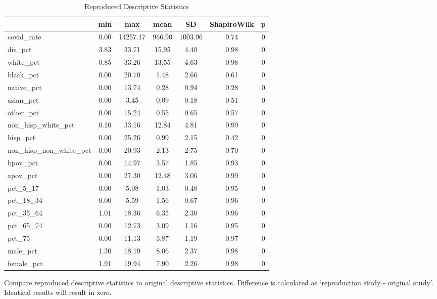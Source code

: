 \documentclass[
]{article}
\begin{document}
\begin{table}

\caption{\label{tab:descriptive-statistics}Reproduced Descriptive Statistics}
\centering
\begin{tabular}[t]{l|>{}c|>{}c|>{}c|>{}c|>{}c|>{}c}
\hline
  & min & max & mean & SD & ShapiroWilk & p\\
\hline
covid\_rate & 0.00 & 14257.17 & 966.90 & 1003.96 & 0.74 & 0\\
\hline
dis\_pct & 3.83 & 33.71 & 15.95 & 4.40 & 0.98 & 0\\
\hline
white\_pct & 0.85 & 33.26 & 13.55 & 4.63 & 0.98 & 0\\
\hline
black\_pct & 0.00 & 20.70 & 1.48 & 2.66 & 0.61 & 0\\
\hline
native\_pct & 0.00 & 13.74 & 0.28 & 0.94 & 0.28 & 0\\
\hline
asian\_pct & 0.00 & 3.45 & 0.09 & 0.18 & 0.51 & 0\\
\hline
other\_pct & 0.00 & 15.24 & 0.55 & 0.65 & 0.57 & 0\\
\hline
non\_hisp\_white\_pct & 0.10 & 33.16 & 12.84 & 4.81 & 0.99 & 0\\
\hline
hisp\_pct & 0.00 & 25.26 & 0.99 & 2.15 & 0.42 & 0\\
\hline
non\_hisp\_non\_white\_pct & 0.00 & 20.93 & 2.13 & 2.75 & 0.70 & 0\\
\hline
bpov\_pct & 0.00 & 14.97 & 3.57 & 1.85 & 0.93 & 0\\
\hline
apov\_pct & 0.00 & 27.30 & 12.48 & 3.06 & 0.99 & 0\\
\hline
pct\_5\_17 & 0.00 & 5.08 & 1.03 & 0.48 & 0.95 & 0\\
\hline
pct\_18\_34 & 0.00 & 5.59 & 1.56 & 0.67 & 0.96 & 0\\
\hline
pct\_35\_64 & 1.01 & 18.36 & 6.35 & 2.30 & 0.96 & 0\\
\hline
pct\_65\_74 & 0.00 & 12.73 & 3.09 & 1.16 & 0.95 & 0\\
\hline
pct\_75 & 0.00 & 11.13 & 3.87 & 1.19 & 0.97 & 0\\
\hline
male\_pct & 1.30 & 18.19 & 8.06 & 2.37 & 0.98 & 0\\
\hline
female\_pct & 1.91 & 19.94 & 7.90 & 2.26 & 0.98 & 0\\
\hline
\end{tabular}
\end{table}

Compare reproduced descriptive statistics to original descriptive
statistics. Difference is calculated as `reproduction study - original
study'. Identical results will result in zero.
\end{document}
